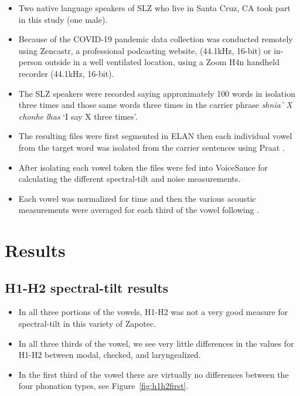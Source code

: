 \documentclass[12pt, letterpaper]{article}
\begin{document}
\begin{itemize}
	\item Two native language speakers of SLZ who live in Santa Cruz, CA took part in this study (one male). 
	\item Because of the COVID-19 pandemic data collection was conducted remotely using Zencastr, a professional podcasting website, (44.1kHz, 16-bit) or in-person outside in a well ventilated location, using a Zoom H4n handheld recorder (44.1kHz, 16-bit).
	\item The SLZ speakers were recorded saying approximately 100 words in isolation three times and those same words three times in the carrier phrase \textit{shnia' X chonhe lhas} `I say X three times'. 
	\item The resulting files were first segmented in ELAN \citep{wittenburgELANProfessionalFramework2006} then each individual vowel from the target word was isolated from the carrier sentences using Praat \citep{boersmaPraatDoingPhonetics2021}. 
	\item After isolating each vowel token the files were fed into VoiceSauce \citep{shueVOICESAUCEProgramVoice2009} for calculating the different spectral-tilt and noise measurements. 
	\item Each vowel was normalized for time and then the various acoustic measurements were averaged for each third of the vowel following \citet{garellekAcousticConsequencesPhonation2011}.
\end{itemize}

\section{Results} \label{sec:Results}

\subsection{H1-H2 spectral-tilt results} \label{sec:H1H2}

\begin{itemize}
	\item In all three portions of the vowels, H1-H2 was not a very good measure for spectral-tilt in this variety of Zapotec. 
	\item In all three thirds of the vowel, we see very little differences in the values for H1-H2 between modal, checked, and laryngealized.  
	\item In the first third of the vowel there are virtually no differences between the four phonation types, see Figure~\ref{fig:h1h2first}.
\end{itemize}
\end{document}
